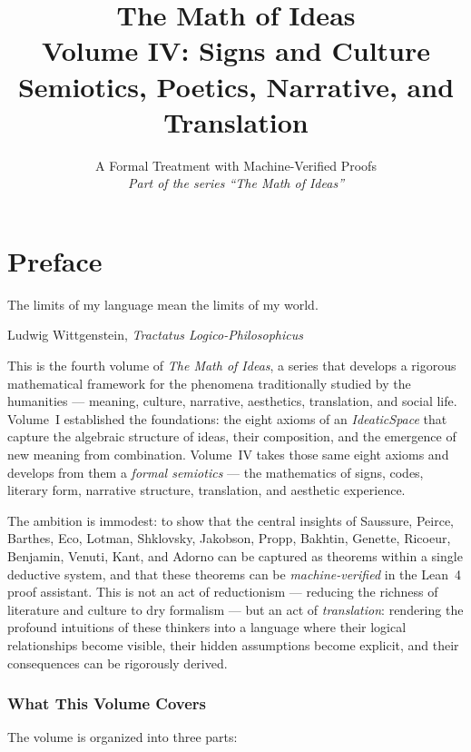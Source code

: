 \documentclass[11pt,oneside]{book}
\title{\Huge\bfseries The Math of Ideas\\[0.3em]
\LARGE Volume IV: Signs and Culture\\[0.5em]
\Large Semiotics, Poetics, Narrative, and Translation}
\author{A Formal Treatment with Machine-Verified Proofs\\[0.3em]
\normalsize\textit{Part of the series ``The Math of Ideas''}}
\date{}
\theoremstyle{plain}
\theoremstyle{definition}
\theoremstyle{remark}
\begin{document}
\maketitle

\frontmatter

\chapter*{Preface}

\epigraph{The limits of my language mean the limits of my world.}{Ludwig Wittgenstein, \textit{Tractatus Logico-Philosophicus}}

This is the fourth volume of \textit{The Math of Ideas}, a series that develops
a rigorous mathematical framework for the phenomena traditionally studied by the
humanities --- meaning, culture, narrative, aesthetics, translation, and social
life. Volume~I established the foundations: the eight axioms of an
\textit{IdeaticSpace} that capture the algebraic structure of ideas, their
composition, and the emergence of new meaning from combination. Volume~IV takes
those same eight axioms and develops from them a \textit{formal semiotics} ---
the mathematics of signs, codes, literary form, narrative structure, translation,
and aesthetic experience.

The ambition is immodest: to show that the central insights of Saussure, Peirce,
Barthes, Eco, Lotman, Shklovsky, Jakobson, Propp, Bakhtin, Genette, Ricoeur,
Benjamin, Venuti, Kant, and Adorno can be captured as theorems within a single
deductive system, and that these theorems can be \textit{machine-verified} in
the Lean~4 proof assistant. This is not an act of reductionism --- reducing the
richness of literature and culture to dry formalism --- but an act of
\textit{translation}: rendering the profound intuitions of these thinkers into a
language where their logical relationships become visible, their hidden
assumptions become explicit, and their consequences can be rigorously derived.

\subsection*{What This Volume Covers}

The volume is organized into three parts:
\end{document}

